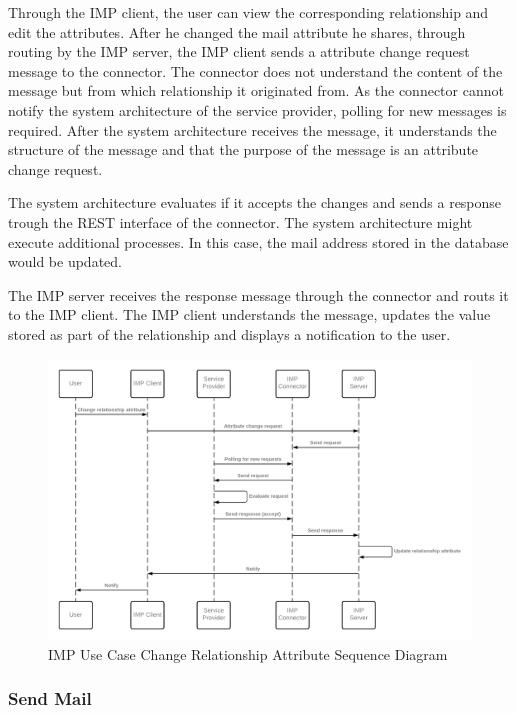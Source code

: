 Through the IMP client, the user can view the corresponding relationship and edit the attributes. After he changed the mail attribute he shares, through routing by the IMP server, the IMP client sends a attribute change request message to the connector. The connector does not understand the content of the message but from which relationship it originated from. As the connector cannot notify the system architecture of the service provider, polling for new messages is required. After the system architecture receives the message, it understands the structure of the message and that the purpose of the message is an attribute change request.

The system architecture evaluates if it accepts the changes and sends a response trough the REST interface of the connector. The system architecture might execute additional processes. In this case, the mail address stored in the database would be updated.

The IMP server receives the response message through the connector and routs it to the IMP client. The IMP client understands the message, updates the value stored as part of the relationship and displays a notification to the user.

\begin{figure}[h]
    \centering
    \caption{IMP Use Case Change Relationship Attribute Sequence Diagram}
    \includegraphics[scale=0.3]{Diagrams/IMP Use Case Change Realtionship Attribute Sequence Diagram.png}
\end{figure}

\subsubsection{Send Mail}

